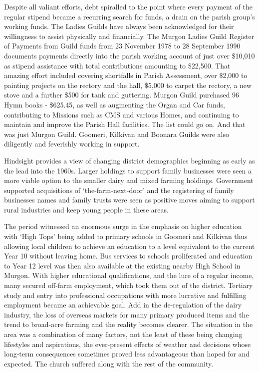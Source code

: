 Despite all valiant efforts, debt spiralled to the point where every payment of the regular stipend became a recurring search for funds, a drain on the parish group's working funds. The Ladies Guilds have always been acknowledged for their willingness to assist physically and financially. The Murgon Ladies Guild Register of Payments from Guild funds from 23 November 1978 to 28 September 1990 documents payments directly into the parish working account of just over \$10,010 as stipend assistance with total contributions amounting to \$22,500. That amazing effort included covering shortfalls in Parish Assessment, over \$2,000 to painting projects on the rectory and the hall, \$5,000 to carpet the rectory, a new stove and a further \$500 for tank and guttering. Murgon Guild purchased 96 Hymn books - \$625.45, as well as augmenting the Organ and Car funds, contributing to Missions such as CMS and various Homes, and continuing to maintain and improve the Parish Hall facilities. The list could go on. And that was just Murgon Guild. Goomeri, Kilkivan and Boonara Guilds were also diligently and feverishly working in support.



Hindsight provides a view of changing district demographics beginning as early as the lead into the 1960s. Larger holdings to support family businesses were seen a more viable option to the smaller dairy and mixed farming holdings. Government supported acquisitions of `the-farm-next-door' and the registering of family businesses names and family trusts were seen as positive moves aiming to support rural industries and keep young people in these areas.



The period witnessed an enormous surge in the emphasis on higher education with `High Tops' being added to primary schools in Goomeri and Kilkivan thus allowing local children to achieve an education to a level equivalent to the current Year 10 without leaving home. Bus services to schools proliferated and education to Year 12 level was then also available at the existing nearby High School in Murgon. With higher educational qualifications, and the lure of a regular income, many secured off-farm employment, which took them out of the district. Tertiary study and entry into professional occupations with more lucrative and fulfilling employment became an achievable goal. Add in the de-regulation of the dairy industry, the loss of overseas markets for many primary produced items and the trend to broad-acre farming and the reality becomes clearer. The situation in the area was a combination of many factors, not the least of these being changing lifestyles and aspirations, the ever-present effects of weather and decisions whose long-term consequences sometimes proved less advantageous than hoped for and expected. The church suffered along with the rest of the community.



